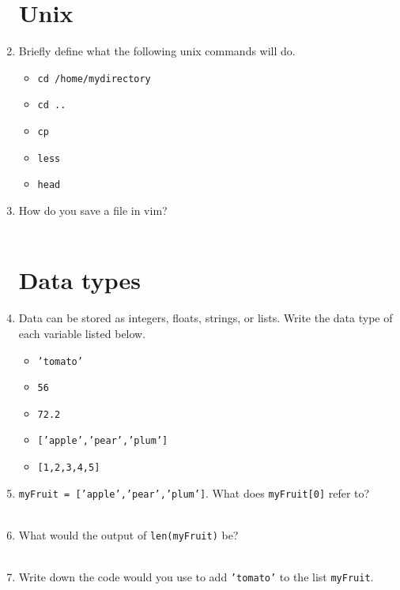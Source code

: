 \documentclass[11pt]{article}
\begin{document}
\begin{enumerate}
\section*{Unix}
\item Briefly define what the following unix commands will do.
  \begin{itemize}
  \item \texttt{cd /home/mydirectory}\\
  \item \texttt{cd ..}\\
  \item \texttt{cp}\\
  \item \texttt{less}\\
  \item \texttt{head}\\
  \end{itemize}

\item How do you save a file in vim? \\
  \\


\section*{Data types}

\item Data can be stored as integers, floats, strings, or lists. Write the data type of each variable listed below.
\begin{itemize}
\item \texttt{'tomato'}
  \item \texttt{56}
  \item \texttt{72.2}
  \item \texttt{['apple','pear','plum']}
    \item \texttt{[1,2,3,4,5]}\\
\end{itemize}

\item \texttt{myFruit = ['apple','pear','plum']}. What does \texttt{myFruit[0]} refer to?\\
  \\
\item What would the output of \texttt{len(myFruit)} be?\\
  \\

\item Write down the code would you use to add \texttt{'tomato'} to the list \texttt{myFruit}.\\
\\
\\
\\
\\

\end{enumerate}
\end{document}
